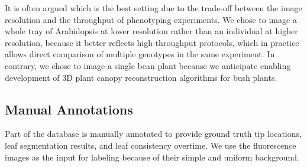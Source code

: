 
It is often argued which is the best setting due to the trade-off between the image resolution and the throughput of phenotyping experiments.
We chose to image a whole tray of Arabidopsis at lower resolution rather than an individual at higher resolution, because it better reflects high-throughput protocols, which in practice allows direct comparison of multiple genotypes in the same experiment.
In contrary, we chose to image a single bean plant because we anticipate enabling development of $3$D plant canopy reconstruction algorithms for bush plants.


\subsection{Manual Annotations}
\label{sec:annotation}
Part of the database is manually annotated to provide ground truth tip locations, leaf segmentation results, and leaf consistency overtime.
We use the fluorescence images as the input for labeling because of their simple and uniform background.

